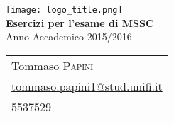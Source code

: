 \begin{center}
   	\texttt{[image: logo\_title.png]}\\[0.8cm]
    {\huge\bfseries Esercizi per l'esame di MSSC}\\
    Anno Accademico 2015/2016\\[0.8cm]

    \begin{tabular*}{\linewidth}{l}
        Tommaso \textsc{Papini}\\
        \href{mailto:tommaso.papini1@stud.unifi.it}{tommaso.papini1@stud.unifi.it}\\
        5537529
    \end{tabular*}\\[1.2cm]
\end{center}
